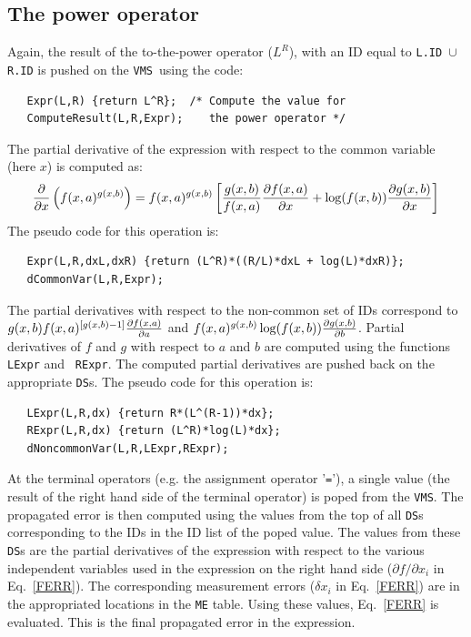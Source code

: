 \documentclass[12pt]{article}
\newcommand{\DS}{{\tt DS}}
\newcommand{\VMS}{{\tt VMS}}
\begin{document}
%
%
\subsection{The power operator}

Again, the result of the to-the-power operator ($L^R$), with an ID
equal to {\tt L.ID $\cup$ R.ID} is pushed on the \VMS\ using the code:
\begin{verbatim}
   Expr(L,R) {return L^R};  /* Compute the value for 
   ComputeResult(L,R,Expr);    the power operator */
\end{verbatim}
The partial derivative of the expression with respect to the common
variable (here $x$) is computed as:
\begin{equation}
{\partial \over {\partial
x}}\left(f(x,a)^{g(x,b)}\right)=f(x,a)^{g(x,b)} \left[{g(x,b) \over
f(x,a)} {\partial f(x,a)  \over \partial x} + \log(f(x,b)) 
{\partial g(x,b) \over \partial x} \right] 
\end{equation}
The pseudo code for this operation is:
\begin{verbatim}
   Expr(L,R,dxL,dxR) {return (L^R)*((R/L)*dxL + log(L)*dxR)};
   dCommonVar(L,R,Expr);
\end{verbatim}
The partial derivatives with respect to the non-common set of IDs
correspond to $g(x,b)f(x,a)^{[g(x,b)-1]} {\partial f(x,a) \over
{\partial a}}$ and $f(x,a)^{g(x,b)} \log(f(x,b)) {\partial g(x,b)
\over \partial b}$.  Partial derivatives of $f$ and $g$ with respect
to $a$ and $b$ are computed using the functions {\tt LExpr} and {\tt
RExpr}.  The computed partial derivatives are pushed back on the
appropriate \DS s.  The pseudo code for this operation is:
\begin{verbatim}
   LExpr(L,R,dx) {return R*(L^(R-1))*dx};
   RExpr(L,R,dx) {return (L^R)*log(L)*dx};
   dNoncommonVar(L,R,LExpr,RExpr);
\end{verbatim}
At the terminal operators (e.g. the assignment operator '{\tt =}'), a
single value (the result of the right hand side of the terminal
operator) is poped from the \VMS.  The propagated error is then
computed using the values from the top of all {\tt DS}s corresponding
to the IDs in the ID list of the poped value.  The values from these
\DS s are the partial derivatives of the expression with respect
to the various independent variables used in the expression on the
right hand side ($\partial f / \partial x_i$ in Eq.~\ref{FERR}).  The
corresponding measurement errors ($\delta x_i$ in Eq.~\ref{FERR}) are
in the appropriated locations in the {\tt ME} table.  Using these
values, Eq.~\ref{FERR} is evaluated.  This is the final propagated
error in the expression.
\end{document}
